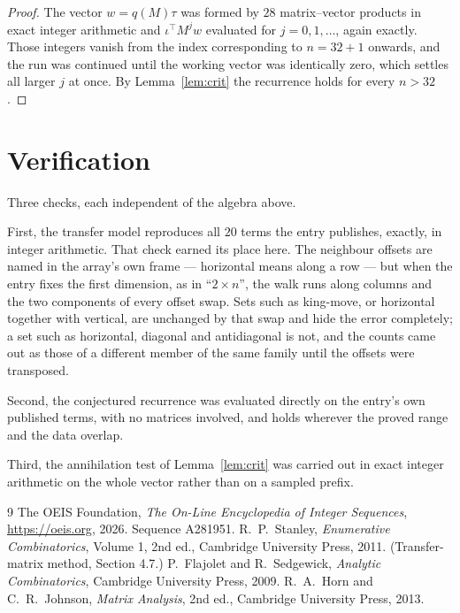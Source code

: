 \documentclass[11pt,a4paper]{article}
\theoremstyle{plain}
\theoremstyle{definition}
\begin{document}
\begin{proof}
The vector $w=q(M)\tau$ was formed by $28$ matrix--vector products in exact integer
arithmetic and $\iota^{\!\top}M^{j}w$ evaluated for $j=0,1,\dots$, again exactly. Those
integers vanish from the index corresponding to $n=32+1$ onwards, and the run was
continued until the working vector was identically zero, which settles all larger $j$ at once.
By Lemma~\ref{lem:crit} the recurrence holds for every $n>32$.
\end{proof}

\section{Verification}

Three checks, each independent of the algebra above.

First, the transfer model reproduces all $20$ terms the entry publishes, exactly, in
integer arithmetic. That check earned its place here. The neighbour offsets are named in the
array's own frame --- horizontal means along a row --- but when the entry fixes the first
dimension, as in ``$2\times n$'', the walk runs along columns and the two components of every
offset swap. Sets such as king-move, or horizontal together with vertical, are unchanged by
that swap and hide the error completely; a set such as horizontal, diagonal and antidiagonal
is not, and the counts came out as those of a different member of the same family until the
offsets were transposed.

Second, the conjectured recurrence was evaluated directly on the entry's own published terms,
with no matrices involved, and holds wherever the proved range and the data overlap.

Third, the annihilation test of Lemma~\ref{lem:crit} was carried out in exact integer
arithmetic on the whole vector rather than on a sampled prefix.

\begin{thebibliography}{9}
 The OEIS Foundation, \emph{The On-Line Encyclopedia of Integer
Sequences}, \url{https://oeis.org}, 2026. Sequence A281951.
 R.~P.~Stanley, \emph{Enumerative Combinatorics}, Volume 1, 2nd ed.,
Cambridge University Press, 2011. (Transfer-matrix method, Section 4.7.)
 P.~Flajolet and R.~Sedgewick, \emph{Analytic Combinatorics}, Cambridge
University Press, 2009.
 R.~A.~Horn and C.~R.~Johnson, \emph{Matrix Analysis}, 2nd ed., Cambridge
University Press, 2013.
\end{thebibliography}
\end{document}

